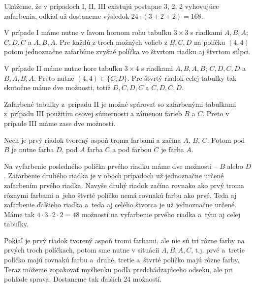 {Ukážeme, že v prípadoch I, II, III existujú postupne 3, 2, 2 vyhovujúce zafarbenia, odkiaľ už dostaneme výsledok $24\cdot(3+2+2)=168$.

V prípade I máme nutne v ľavom hornom rohu tabuľku $3\times3$ s riadkami $A,B,A$; $C,D,C$ a $A,B,A$. Pre každú z troch možných volieb z $B,C,D$ na políčku $(4,4)$ potom jednoznačne zafarbíme zvyšné políčka vo štvrtom riadku aj štvrtom stĺpci.
\midinsert
\centerline{
 \hfil
{}\hfil
}
\endinsert


V prípade II máme nutne hore tabuľku $3\times4$ s riadkami $A,B,A,B$; $C,D,C,D$ a~$B,A,B,A$. Preto nutne $(4,4)\in\{C,D\}$. Pre štvrtý riadok celej tabuľky tak skutočne máme dve možnosti, totiž $D,C,D,C$ a $C,D,C,D$.
\midinsert
\centerline{
\hfil
}
\endinsert


Zafarbené tabuľky z~prípadu II je možné spárovať so zafarbenými tabuľkami z~prípadu III použitím osovej súmernosti a zámenou farieb $B$ a $C$. Preto v prípade III máme zase dve možnosti.

\ineriesenie
Nech je prvý riadok tvorený aspoň troma farbami a začína $A$, $B$, $C$. Potom pod $B$ je nutne farba $D$, pod $A$ farba $C$ a pod farbou $C$ je farba $A$.
\midinsert
\centerline{
}
\endinsert


Na vyfarbenie posledného políčka prvého riadku máme dve možnosti -- $B$ alebo $D$.
Zafarbenie druhého riadka je v oboch prípadoch už jednoznačne určené zafarbením prvého riadka. Navyše druhý riadok začína rovnako ako prvý troma rôznymi farbami a~jeho štvrté políčko nemá rovnakú farbu ako prvé. Teda aj zafarbenie
ďalšieho riadka a~teda aj celého štvorca je už jednoznačne určené.
Máme tak $4\cdot 3\cdot 2\cdot 2=48$ možností na vyfarbenie prvého riadka a~tým aj celej tabuľky.

Pokiaľ je prvý riadok tvorený aspoň tromi farbami, ale nie sú tri rôzne farby na prvých troch políčkach, potom sme nutne v situácii $A,B,A,C$, t.\j. prvé a~tretie políčko majú rovnakú farbu a~druhé, tretie a~štvrté políčko majú rôzne farby. Teraz môžeme zopakovať myšlienku podľa predchádzajúceho odseku, ale pri pohľade sprava. Dostaneme tak ďalších $24$ možností.

}
